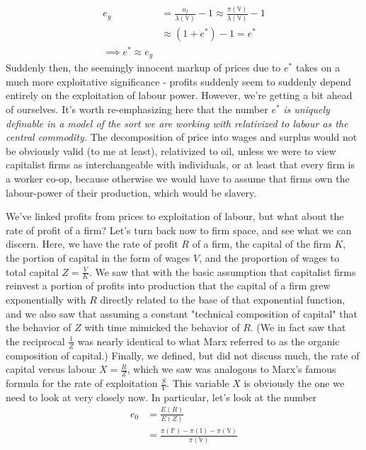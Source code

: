 \documentclass{article}
\theoremstyle{definition}
\theoremstyle{plain}
\theoremstyle{theorem}
\begin{document}
\begin{align}
	e_g &= \frac{n_l}{\lambda(\mathbb{V})} - 1 \approx \frac{\pi(\mathbb{V})}{\lambda(\mathbb{V})} - 1  \\
		&\approx (1+e^*)-1 = e^* \\
		\implies e^* \approx e_g
\end{align}
Suddenly then, the seemingly innocent markup of prices due to $e^*$ takes on a much more exploitative significance - profits suddenly seem to suddenly depend entirely on the exploitation of labour power. However, we're getting a bit ahead of ourselves. It's worth re-emphasizing here that the number $e^*$ \textit{is uniquely definable in a model of the sort we are working with relativized to labour as the central commodity.} The decomposition of price into wages and surplus would not be obviously valid (to me at least), relativized to oil, unless we were to view capitalist firms as interchangeable with individuals, or at least that every firm is a worker co-op, because otherwise we would have to assume that firms own the labour-power of their production, which would be slavery. \par 
We've linked profits from prices to exploitation of labour, but what about the rate of profit of a firm? Let's turn back now to firm space, and see what we can discern. Here, we have the rate of profit $R$ of a firm, the capital of the firm $K$, the portion of capital in the form of wages $V$, and the proportion of wages to total capital $Z = \frac{V}{K}$. We saw that with the basic assumption that capitalist firms reinvest a portion of profits into production that the capital of a firm grew exponentially with $R$ directly related to the base of that exponential function, and we also saw that assuming a constant "technical composition of capital" that the behavior of $Z$ with time mimicked the behavior of $R$. (We in fact saw that the reciprocal $\frac{1}{Z}$ was nearly identical to what Marx referred to as the organic composition of capital.) Finally, we defined, but did not discuss much, the rate of capital versus labour $X = \frac{R}{Z}$, which we saw was analogous to Marx's famous formula for the rate of exploitation $\frac{S}{V}$. This variable $X$ is obviously the one we need to look at very closely now. In particular, let's look at the number 
\begin{align}
	e_0 &= \frac{E(R)}{E(Z)} \\
	&= \frac{\pi(\mathbb{P}) - \pi(\mathbb{I}) - \pi(\mathbb{V})}{\pi(\mathbb{V})}
\end{align}  
\end{document}
